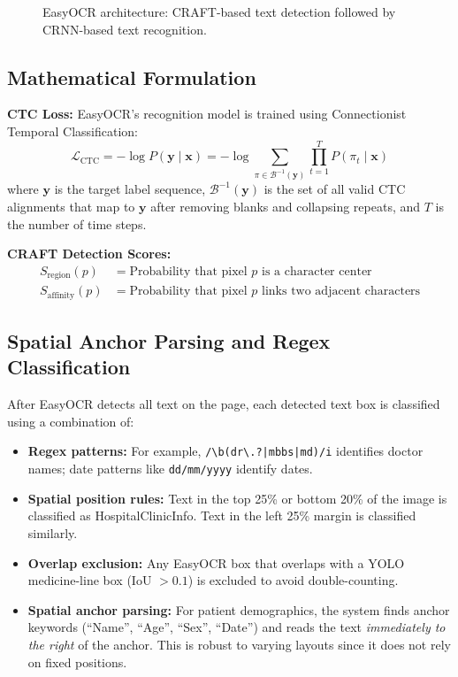 \documentclass[12pt,a4paper,oneside]{report}
\begin{document}
\begin{figure}[H]
\centering
\caption{EasyOCR architecture: CRAFT-based text detection followed by CRNN-based text recognition.}
\label{fig:easyocr_arch}
\end{figure}

\subsection{Mathematical Formulation}

\textbf{CTC Loss:} EasyOCR's recognition model is trained using Connectionist Temporal Classification:
\begin{equation}
\mathcal{L}_{\text{CTC}} = -\log P(\mathbf{y} \mid \mathbf{x}) = -\log \sum_{\pi \in \mathcal{B}^{-1}(\mathbf{y})} \prod_{t=1}^{T} P(\pi_t \mid \mathbf{x})
\end{equation}
where $\mathbf{y}$ is the target label sequence, $\mathcal{B}^{-1}(\mathbf{y})$ is the set of all valid CTC alignments that map to $\mathbf{y}$ after removing blanks and collapsing repeats, and $T$ is the number of time steps.

\textbf{CRAFT Detection Scores:}
\begin{align}
S_{\text{region}}(p) &= \text{Probability that pixel } p \text{ is a character center} \\
S_{\text{affinity}}(p) &= \text{Probability that pixel } p \text{ links two adjacent characters}
\end{align}

\subsection{Spatial Anchor Parsing and Regex Classification}

After EasyOCR detects all text on the page, each detected text box is classified using a combination of:

\begin{itemize}
  \item \textbf{Regex patterns:} For example, \texttt{/\textbackslash b(dr\textbackslash .?|mbbs|md)/i} identifies doctor names; date patterns like \texttt{dd/mm/yyyy} identify dates.
  \item \textbf{Spatial position rules:} Text in the top 25\% or bottom 20\% of the image is classified as HospitalClinicInfo. Text in the left 25\% margin is classified similarly.
  \item \textbf{Overlap exclusion:} Any EasyOCR box that overlaps with a YOLO medicine-line box (IoU $> 0.1$) is excluded to avoid double-counting.
  \item \textbf{Spatial anchor parsing:} For patient demographics, the system finds anchor keywords (``Name'', ``Age'', ``Sex'', ``Date'') and reads the text \emph{immediately to the right} of the anchor. This is robust to varying layouts since it does not rely on fixed positions.
\end{itemize}
\end{document}
